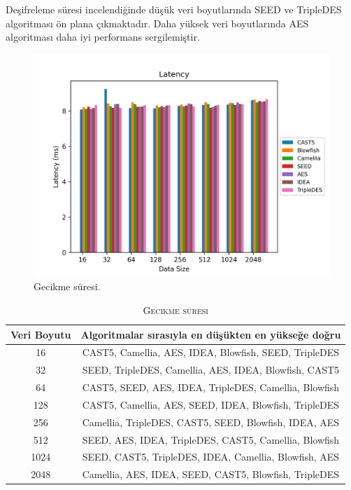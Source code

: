 \documentclass[conference, a4paper]{IEEEtran}
\begin{document}
    Deşifreleme süresi incelendiğinde düşük veri boyutlarında SEED ve TripleDES algoritması ön plana çıkmaktadır. Daha yüksek veri boyutlarında AES algoritması daha iyi performans sergilemiştir.

    \begin{figure}[H]
    \centering
    \shorthandoff{=}  
    \includegraphics[scale=0.52]{fig9.png}
    \shorthandon{=} 
    \caption{Gecikme süresi.}
    \label{sekil9}
    \end{figure}

    \begin{table}[h]
        \centering
        \caption{\textsc{Gecikme süresi}}
        \label{tablo6}
        \begin{tabular}{|c|c|}
            \hline
                Veri Boyutu & Algoritmalar sırasıyla en düşükten en yükseğe doğru \\
            \hline
            16 & CAST5, Camellia, AES, IDEA, Blowfish, SEED, TripleDES \\
            \hline
            32 & SEED, TripleDES, Camellia, AES, IDEA, Blowfish, CAST5 \\
            \hline
            64 & CAST5, SEED, AES, IDEA, TripleDES, Camellia, Blowfish \\
            \hline
            128 & CAST5, Camellia, AES, SEED, IDEA, Blowfish, TripleDES \\
            \hline
            256 & Camellia, TripleDES, CAST5, SEED, Blowfish, IDEA, AES \\
            \hline
            512 & SEED, AES, IDEA, TripleDES, CAST5, Camellia, Blowfish \\
            \hline
            1024 & SEED, CAST5, TripleDES, IDEA, Camellia, Blowfish, AES \\
            \hline
            2048 & Camellia, AES, IDEA, SEED, CAST5, Blowfish, TripleDES \\
            \hline
        \end{tabular}
    \end{table}  
\end{document}
